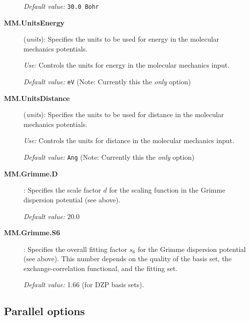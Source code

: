 \documentclass[11pt]{article}
\begin{document}
\begin{description}
{\it Default value:}  {\tt 30.0 Bohr}

\item[{\bf MM.UnitsEnergy}] ({\it units}):  Specifies the units to be used for energy in the 
molecular mechanics potentials.

{\it Use:} Controls the units for energy in the molecular mechanics input.

{\it Default value:}  {\tt eV} (Note: Currently this the {\em only} option)

\item[{\bf MM.UnitsDistance}] ({\it units}):  Specifies the units to be used for distance in the 
molecular mechanics potentials.

{\it Use:} Controls the units for distance in the molecular mechanics input.

{\it Default value:}  {\tt Ang} (Note: Currently this the {\em only} option)

\item[{\bf MM.Grimme.D}] :  Specifies the scale factor $d$ for the scaling function
in the Grimme dispersion potential (see above).

{\it Default value:}  { 20.0 } 

\item[{\bf MM.Grimme.S6}] :  Specifies the overall fitting factor $s_6$ for the
Grimme dispersion potential (see above). This number depends on the
quality of the basis set, the exchange-correlation functional, and the
fitting set. 

{\it Default value:}  { 1.66 } (for DZP basis sets).

\end{description}

\vspace{5pt}
\subsection{Parallel options}
\end{document}
